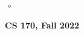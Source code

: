 \documentclass[12pt,letterpaper]{scrartcl}
\begin{document}
\thispagestyle{empty}
$ $
\vfill$\circ$
\begin{center}
\centerline{\huge \textbf{CS 170, Fall 2022}} 
\end{center}
\vfill
$ $
\newpage
\tableofcontents
\newpage
\renewcommand\thesubsection{\thesection.\alph{subsection}}
\renewcommand\thesubsubsection{\thesection.\roman{subsubsection}}
 \vfill
 \vfill
%  
\end{document}
